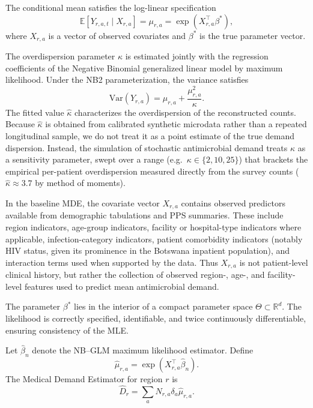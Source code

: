 \documentclass{article}
\begin{document}
\begin{assumption}
\label{assump:glm}
The conditional mean satisfies the log-linear specification
\[
\mathbb{E}[Y_{r,a,t}\mid X_{r,a}]
=
\mu_{r,a}
=
\exp(X_{r,a}^{\top}\beta^{*}),
\]
where $X_{r,a}$ is a vector of observed covariates and $\beta^{*}$ is the true parameter vector.
\end{assumption}

The overdispersion parameter $\kappa$ is estimated jointly with the regression coefficients of the Negative Binomial generalized linear model by maximum likelihood. Under the NB2 parameterization, the variance satisfies
\[
\mathrm{Var}(Y_{r,a}) = \mu_{r,a} + \frac{\mu_{r,a}^2}{\kappa}.
\]
The fitted value $\hat{\kappa}$ characterizes the overdispersion of the reconstructed counts. Because $\hat{\kappa}$ is obtained from calibrated synthetic microdata rather than a repeated longitudinal sample, we do not treat it as a point estimate of the true demand dispersion. Instead, the simulation of stochastic antimicrobial demand treats $\kappa$ as a sensitivity parameter, swept over a range (e.g.\ $\kappa \in \{2, 10, 25\}$) that brackets the empirical per-patient overdispersion measured directly from the survey counts ($\hat{\kappa}\approx 3.7$ by method of moments).

In the baseline MDE, the covariate vector \(X_{r,a}\) contains observed predictors available from demographic tabulations and PPS summaries. These include region indicators, age-group indicators, facility or hospital-type indicators where applicable, infection-category indicators, patient comorbidity indicators (notably HIV status, given its prominence in the Botswana inpatient population), and interaction terms used when supported by the data. Thus \(X_{r,a}\) is not patient-level clinical history, but rather the collection of observed region-, age-, and facility-level features used to predict mean antimicrobial demand.

\begin{assumption}
\label{assump:regularity}
The parameter $\beta^{*}$ lies in the interior of a compact parameter space $\Theta\subset\mathbb{R}^{d}$. The likelihood is correctly specified, identifiable, and twice continuously differentiable, ensuring consistency of the MLE.
\end{assumption}

\begin{definition}
\label{def:mde}
Let $\hat\beta_n$ denote the NB--GLM maximum likelihood estimator. Define
\[
\hat\mu_{r,a}=\exp(X_{r,a}^{\top}\hat\beta_n).
\]
The Medical Demand Estimator for region $r$ is
\[
\hat D_r
=
\sum_a N_{r,a}\delta_a\hat\mu_{r,a}.
\]
\end{definition}
\end{document}
